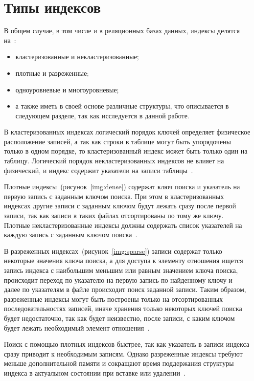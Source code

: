 \section{Типы индексов}

В общем случае, в том числе и в реляционных базах данных, индексы делятся
на~\cite{ship}:
\begin{itemize}
    \item кластеризованные и некластеризованные;
    \item плотные и разреженные;
    \item одноуровневые и многоуровневые;
    \item а также иметь в своей основе различные структуры, что описывается в
        следующем разделе, так как исследуется в данной работе.
\end{itemize}

В кластеризованных индексах логический порядок ключей определяет
физическое расположение записей, а так как строки в таблице могут быть
упорядочены только в одном порядке, то кластеризованный индекс может быть
только один на таблицу. Логический порядок {некластеризованных} индексов
не влияет на физический, и индекс содержит указатели на записи
таблицы~\cite{osip}.

Плотные индексы~(рисунок~\ref{img:dense}) содержат ключ поиска и
указатель на первую запись с заданным ключом поиска. При этом в кластеризованных
индексах другие записи с заданным ключом будут лежать сразу после первой записи,
так как записи в таких файлах отсортированы по тому же ключу. Плотные
некластеризованные индексы должны содержать список указателей на каждую запись с
заданным ключом поиска~\cite{ship}.
 

В разреженных индексах~(рисунок~\ref{img:sparse}) записи содержат
только некоторые значения ключа поиска, а для доступа к элементу отношения
ищется запись индекса с наибольшим меньшим или равным значением ключа поиска,
происходит переход по указателю на первую запись по найденному ключу и далее по
указателям в файле происходит поиск заданной записи. Таким образом, разреженные
индексы могут быть построены только на отсортированных последовательностях
записей, иначе хранения только некоторых ключей поиска будет недостаточно, так
как будет неизвестно, после записи, с каким ключом будет лежать необходимый
элемент отношения~\cite{ship}.


Поиск с помощью плотных индексов быстрее, так как указатель в записи индекса
сразу приводит к необходимым записям. Однако разреженные индексы требуют меньше
дополнительной памяти и сокращают время поддержания структуры индекса в
актуальном состоянии при вставке или удалении~\cite{ship}.

